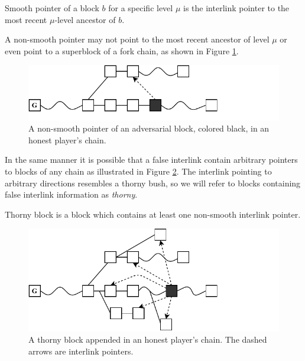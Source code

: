 \begin{definition}
  Smooth pointer of a block $b$ for a specific level $\mu$ is the     interlink pointer to the most recent $\mu$-level ancestor of $b$.
	\label{defn:smooth_pointer}
\end{definition}


A non-smooth pointer may not point to the most recent ancestor of level $\mu$ or even point to a superblock of a fork chain, as shown in Figure \ref{fig:false_interlink}.

\begin{figure}[h]
	\begin{center}
		\includegraphics[scale=0.7]{figures/false_interlink.pdf}
	\end{center}
    \caption{A non-smooth pointer of an adversarial block, colored  black, in an honest player's chain.}
	\label{fig:false_interlink}
\end{figure}

In the same manner it is possible that a false interlink contain arbitrary pointers to blocks of any chain as illustrated in Figure \ref{fig:thorny_block}. The interlink pointing to arbitrary directions resembles a thorny bush, so we will refer to blocks containing false interlink information as \emph{thorny}.

\begin{definition}
	Thorny block is a block which contains at least one non-smooth interlink pointer.
	\label{defn:thorny_block}
\end{definition}

\begin{figure}[h]
	\begin{center}
		\includegraphics[scale=0.75]{figures/thorny_block.pdf}
	\end{center}
	\caption{A thorny block appended in an honest player's chain.
	The dashed arrows are interlink pointers.}
	\label{fig:thorny_block}
\end{figure}

